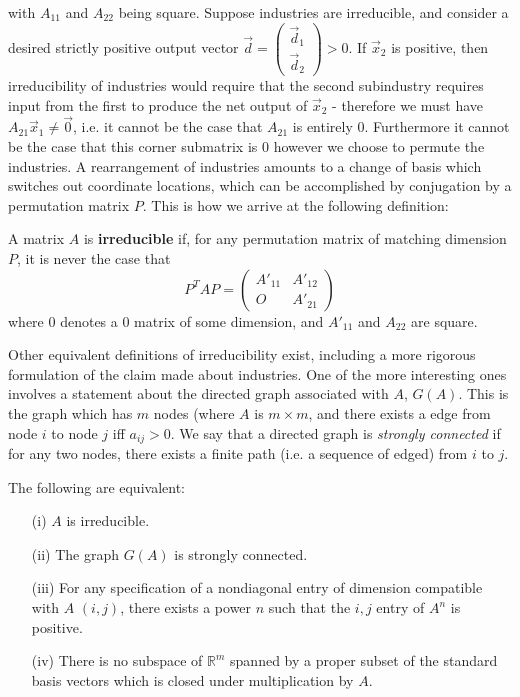 with $A_{11}$ and $A_{22}$ being square. Suppose industries are irreducible, and consider a desired strictly positive output vector $\vec{d} = \begin{pmatrix} \vec{d}_1 \\ \vec{d}_2 \end{pmatrix} > 0$.  If $\vec{x}_2$ is positive, then irreducibility of industries would require that the second subindustry requires input from the first to produce the net output of $\vec{x}_2$ - therefore we must have $A_{21}\vec{x}_1 \neq \vec{0}$, i.e. it cannot be the case that $A_{21}$ is entirely $0$. Furthermore it cannot be the case that this corner submatrix is $0$ however we choose to permute the industries. A rearrangement of industries amounts to a change of basis which switches out coordinate locations, which can be accomplished by conjugation by a permutation matrix $P$. This is how we arrive at the following definition:
\begin{definition}
	A matrix $A$ is \textbf{irreducible} if, for any permutation matrix of matching dimension $P$, it is never the case that
	\[ P^TAP = \begin{pmatrix} A'_{11} & A'_{12} \\ O & A'_{21} \end{pmatrix} \]
where $0$ denotes a $0$ matrix of some dimension, and $A'_{11}$ and $A_{22}$ are square. 
\end{definition}
Other equivalent definitions of irreducibility exist, including a more rigorous formulation of the claim made about industries. One of the more interesting ones involves a statement about the directed graph associated with $A$, $G(A)$. This is the graph which has $m$ nodes (where $A$ is $m\times m$, and there exists a edge from node $i$ to node $j$ iff $a_{ij} > 0$. We say that a directed graph is \emph{strongly connected} if for any two nodes, there exists a finite path (i.e. a sequence of edged) from $i$ to $j$.
\begin{theorem}
	The following are equivalent:
	\begin{itemize}
		\item[(i)] $A$ is irreducible.
		\item[(ii)] The graph $G(A)$ is strongly connected.
		\item[(iii)] For any specification of a nondiagonal entry of dimension compatible with $A$ $(i,j)$, there exists a power $n$ such that the $i,j$ entry of $A^n$ is positive.
		\item[(iv)] There is no subspace of $\mathbb{R}^m$ spanned by a proper subset of the standard basis vectors which is closed under multiplication by $A$.  
	\end{itemize} 
\end{theorem}

